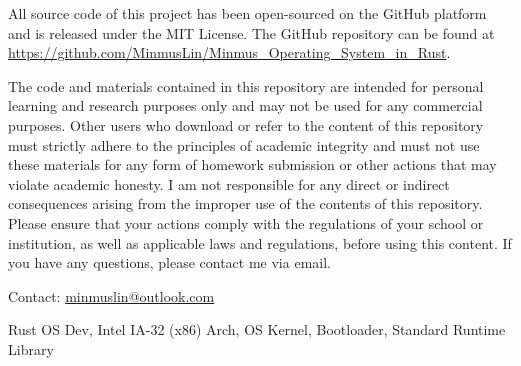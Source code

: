 {    \vspace{16pt}

    All source code of this project has been open-sourced on the GitHub platform and is released under the MIT License. The GitHub repository can be found at \url{https://github.com/MinmusLin/Minmus\_Operating\_System\_in\_Rust}.

    The code and materials contained in this repository are intended for personal learning and research purposes only and may not be used for any commercial purposes. Other users who download or refer to the content of this repository must strictly adhere to the principles of academic integrity and must not use these materials for any form of homework submission or other actions that may violate academic honesty. I am not responsible for any direct or indirect consequences arising from the improper use of the contents of this repository. Please ensure that your actions comply with the regulations of your school or institution, as well as applicable laws and regulations, before using this content. If you have any questions, please contact me via email.

    Contact: \href{mailto:minmuslin@outlook.com}{minmuslin@outlook.com}
}{Rust OS Dev, Intel IA-32 (x86) Arch, OS Kernel, Bootloader, Standard Runtime Library}